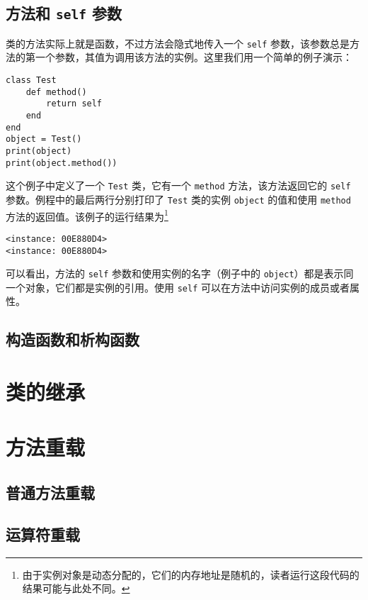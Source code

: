 \subsection{方法和 \texttt{self} 参数}

类的方法实际上就是函数，不过方法会隐式地传入一个 \texttt{self} 参数，该参数总是方法的第一个参数，其值为调用该方法的实例。这里我们用一个简单的例子演示：
\begin{lstlisting}[language=berry, numbers=none]
class Test
    def method()
        return self
    end
end
object = Test()
print(object)
print(object.method())
\end{lstlisting}
这个例子中定义了一个 \texttt{Test} 类，它有一个 \texttt{method} 方法，该方法返回它的 \texttt{self} 参数。例程中的最后两行分别打印了 \texttt{Test} 类的实例 \texttt{object} 的值和使用 \texttt{method} 方法的返回值。该例子的运行结果为\footnote{由于实例对象是动态分配的，它们的内存地址是随机的，读者运行这段代码的结果可能与此处不同。}
\begin{lstlisting}[numbers=none]
<instance: 00E880D4>
<instance: 00E880D4>
\end{lstlisting}
可以看出，方法的 \texttt{self} 参数和使用实例的名字（例子中的 \texttt{object}）都是表示同一个对象，它们都是实例的引用。使用 \texttt{self} 可以在方法中访问实例的成员或者属性。

\subsection{构造函数和析构函数}

\section{类的继承}

\section{方法重载}

\subsection{普通方法重载}

\subsection{运算符重载}
